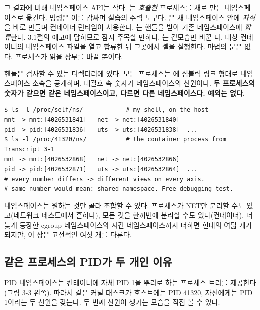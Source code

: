 그 결과에 비해 네임스페이스 API는 작다. 는 \textit{호출한} 프로세스를 새로 만든 네임스페이스로 옮긴다.  명령은 이를 감싸며 실습의 주력 도구다. 은 새 네임스페이스 안에 \textit{자식}을 바로 만들며 컨테이너 런타임이 사용한다. 는 핸들을 받아 기존 네임스페이스에 \textit{합류}한다. 3.1절의 예고에 답하므로 잠시 주목할 만하다. 는 겉모습만 바꾼 다. 대상 컨테이너의 네임스페이스 파일을 열고 합류한 뒤 그곳에서 셸을 실행한다. 마법의 문은 없다. 프로세스가 읽을 장부를 바꿀 뿐이다.

핸들은 검사할 수 있는 디렉터리에 있다. 모든 프로세스는 에 심볼릭 링크 형태로 네임스페이스 소속을 공개하며, 대괄호 속 숫자가 네임스페이스의 신원이다. \textbf{두 프로세스의 숫자가 같으면 같은 네임스페이스이고, 다르면 다른 네임스페이스다. 예외는 없다.}

\begin{terminalbox}
\begin{Verbatim}[breaklines=true,breakanywhere=true,fontsize=\small,formatcom=\color{tbbtermfg},codes=\tbbcodeactive]
$ ls -l /proc/self/ns/            # my shell, on the host
mnt -> mnt:[4026531841]   net -> net:[4026531840]
pid -> pid:[4026531836]   uts -> uts:[4026531838]  ...
$ ls -l /proc/41320/ns/           # the container process from Transcript 3-1
mnt -> mnt:[4026532868]   net -> net:[4026532866]
pid -> pid:[4026532871]   uts -> uts:[4026532864]  ...
# every number differs -> different views on every axis.
# same number would mean: shared namespace. Free debugging test.
\end{Verbatim}
\end{terminalbox}

네임스페이스는 원하는 것만 골라 조합할 수 있다. 프로세스가 NET만 분리할 수도 있고(네트워크 테스트에서 흔하다), 모든 것을 한꺼번에 분리할 수도 있다(컨테이너). 더 늦게 등장한 cgroup 네임스페이스와 시간 네임스페이스까지 더하면 현대의 여덟 개가 되지만, 이 장은 고전적인 여섯 개를 다룬다.

\subsection*{같은 프로세스의 PID가 두 개인 이유}

PID 네임스페이스는 컨테이너에 자체 PID 1을 뿌리로 하는 프로세스 트리를 제공한다(그림 3-3 왼쪽). 따라서 같은 커널 태스크가 호스트에는 PID 41320, 자신에게는 PID 1이라는 두 신원을 갖는다. 두 번째 신원이 생기는 모습을 직접 볼 수 있다.

